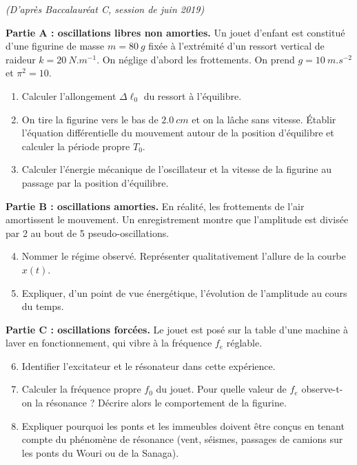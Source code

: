 \documentclass[11pt]{article}
\begin{document}
\begin{exercice}
\textit{(D'après Baccalauréat C, session de juin 2019)}

\textbf{Partie A : oscillations libres non amorties.} Un jouet d'enfant est constitué d'une figurine de masse $m = \SI{80}{g}$ fixée à l'extrémité d'un ressort vertical de raideur $k = \SI{20}{N.m^{-1}}$. On néglige d'abord les frottements. On prend $g = \SI{10}{m.s^{-2}}$ et $\pi^2 = 10$.
\begin{enumerate}
\item Calculer l'allongement $\Delta\ell_0$ du ressort à l'équilibre.
\item On tire la figurine vers le bas de $\SI{2,0}{cm}$ et on la lâche sans vitesse. Établir l'équation différentielle du mouvement autour de la position d'équilibre et calculer la période propre $T_0$.
\item Calculer l'énergie mécanique de l'oscillateur et la vitesse de la figurine au passage par la position d'équilibre.
\end{enumerate}

\textbf{Partie B : oscillations amorties.} En réalité, les frottements de l'air amortissent le mouvement. Un enregistrement montre que l'amplitude est divisée par 2 au bout de 5 pseudo-oscillations.
\begin{enumerate}
\setcounter{enumi}{3}
\item Nommer le régime observé. Représenter qualitativement l'allure de la courbe $x(t)$.
\item Expliquer, d'un point de vue énergétique, l'évolution de l'amplitude au cours du temps.
\end{enumerate}

\textbf{Partie C : oscillations forcées.} Le jouet est posé sur la table d'une machine à laver en fonctionnement, qui vibre à la fréquence $f_e$ réglable.
\begin{enumerate}
\setcounter{enumi}{5}
\item Identifier l'excitateur et le résonateur dans cette expérience.
\item Calculer la fréquence propre $f_0$ du jouet. Pour quelle valeur de $f_e$ observe-t-on la résonance ? Décrire alors le comportement de la figurine.
\item Expliquer pourquoi les ponts et les immeubles doivent être conçus en tenant compte du phénomène de résonance (vent, séismes, passages de camions sur les ponts du Wouri ou de la Sanaga).
\end{enumerate}
\end{exercice}
\end{document}
